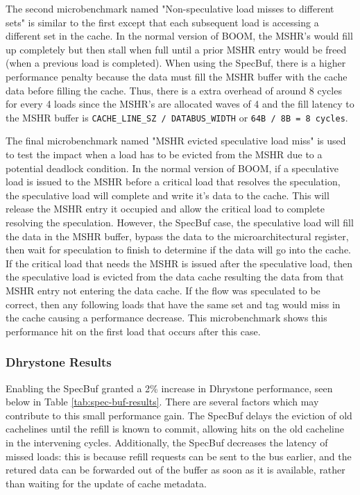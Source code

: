 The second microbenchmark named "Non-speculative load misses to different sets" is similar to the first except that each subsequent
load is accessing a different set in the cache. In the normal version of BOOM, the MSHR's would fill up completely but then stall 
when full until a prior MSHR entry would be freed (when a previous load is completed). When using the SpecBuf, there is a
higher performance penalty because the data must fill the MSHR buffer with the cache data before filling the cache. Thus, there 
is a extra overhead of around 8 cycles for every 4 loads since the MSHR's are allocated waves of 4 and the fill latency to the MSHR
buffer is {\tt CACHE\_LINE\_SZ / DATABUS\_WIDTH} or {\tt 64B / 8B = 8 cycles}.

The final microbenchmark named "MSHR evicted speculative load miss" is used to test the impact when a load has to be evicted from the 
MSHR due to a potential deadlock condition. In the normal version of BOOM, if a speculative load is issued to the 
MSHR before a critical load that resolves the speculation, the speculative load will complete and
write it's data to the cache. This will release the MSHR entry it occupied and allow the critical load to complete resolving the speculation. 
However, the SpecBuf case, the speculative load will fill the data in the MSHR buffer, bypass the data to the microarchitectural register, 
then wait for speculation to finish to determine if the data will go into the cache. If the critical load that needs the MSHR is issued after the speculative load,
then the speculative load is evicted from the data cache resulting the data from that MSHR entry not entering the data cache. If the 
flow was speculated to be correct, then any following loads that have the same set and tag would miss in the cache causing a performance decrease.
This microbenchmark shows this performance hit on the first load that occurs after this case.

\subsubsection{Dhrystone Results}
Enabling the SpecBuf granted a 2\% increase in Dhrystone performance, seen below in Table \ref{tab:spec-buf-results}. There are several factors which may contribute to this small performance gain. The SpecBuf delays the eviction of old cachelines until the refill is known to commit, allowing hits on the old cacheline in the intervening cycles. Additionally, the SpecBuf decreases the latency of missed loads: this is because refill requests can be sent to the bus earlier, and the retured data can be forwarded out of the buffer as soon as it is available, rather than waiting for the update of cache metadata.

